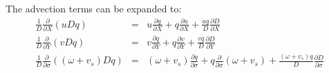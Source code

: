 The advection terms can be expanded to:
\begin{eqnarray}
\frac{1}{D}\frac{\partial }{\partial X} \left(uDq\right) &=&
 u\frac{\partial q}{\partial X} + q\frac{\partial u}{\partial X} + \frac{uq}{D} \frac{\partial D}{\partial X} \\
\frac{1}{D}\frac{\partial }{\partial Y} \left(vDq\right) &=&
 v\frac{\partial q}{\partial Y} + q\frac{\partial v}{\partial Y} + \frac{vq}{D} \frac{\partial D}{\partial Y} \\
\frac{1}{D}\frac{\partial }{\partial \sigma} \left(\left( \omega + v_s \right)Dq\right) &=&
 \left( \omega + v_s \right)\frac{\partial q}{\partial \sigma} + q\frac{\partial }{\partial \sigma}\left( \omega + v_s \right) + 
\frac{\left( \omega + v_s \right)q}{D} \frac{\partial D}{\partial \sigma}
\end{eqnarray}


